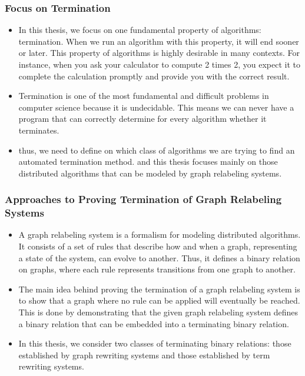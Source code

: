 \subsubsection*{Focus on Termination}
\begin{itemize}
    \item In this thesis, we focus on one fundamental property of algorithms: termination. When we run an algorithm with this property, it will end sooner or later. This property of algorithms is highly desirable in many contexts. For instance, when you ask your calculator to compute 2 times 2, you expect it to complete the calculation promptly and provide you with the correct result.
    \item Termination is one of the most fundamental and difficult problems in computer science because it is undecidable. This means we can never have a program that can correctly determine for every algorithm whether it terminates.
    \item thus, we need to define on which class of algorithms we are trying to find an automated termination method. and this thesis focuses mainly on those distributed algorithms that can be modeled by graph relabeling systems. 
\end{itemize}

\subsubsection*{Approaches to Proving Termination of Graph Relabeling Systems}
\begin{itemize}
    \item A graph relabeling system is a formalism for modeling distributed algorithms. It consists of a set of rules that describe how and when a graph, representing a state of the system, can evolve to another. Thus, it defines a binary relation on graphs, where each rule represents transitions from one graph to another.
    \item The main idea behind proving the termination of a graph relabeling system is to show that a graph where no rule can be applied will eventually be reached. This is done by demonstrating that the given graph relabeling system defines a binary relation that can be embedded into a terminating binary relation.
    \item In this thesis, we consider two classes of terminating binary relations: those established by graph rewriting systems and those established by term rewriting systems.
\end{itemize}

